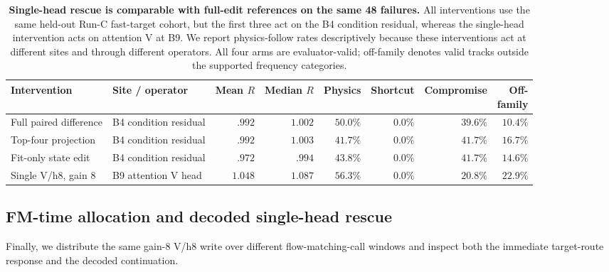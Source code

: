 \begin{table}[!htbp]
  \centering
  \caption{\textbf{Single-head rescue is comparable with full-edit references
  on the same 48 failures.} All interventions use the same held-out Run-C
  fast-target cohort, but the first three act on the B4 condition residual,
  whereas the single-head intervention acts on attention V at B9. We report
  physics-follow rates descriptively because these interventions act at
  different sites and through different operators. All four arms are
  evaluator-valid; off-family denotes valid tracks outside the supported
  frequency categories.}
  \label{tab:single-head-oracle-ceiling}
  \setlength{\tabcolsep}{1.8pt}
  \begin{tabular}{@{}llrrrrrr@{}}
    \toprule
    Intervention & Site / operator & \shortstack{Mean\\$R$} & \shortstack{Median\\$R$} & Physics & Shortcut & Compromise & \shortstack{Off-\\family} \\
    \midrule
    Full paired difference & B4 condition residual & $.992$ & $1.002$ & $50.0\%$ & $0.0\%$ & $39.6\%$ & $10.4\%$ \\
    Top-four projection & B4 condition residual & $.992$ & $1.003$ & $41.7\%$ & $0.0\%$ & $41.7\%$ & $16.7\%$ \\
    Fit-only state edit & B4 condition residual & $.972$ & $.994$ & $43.8\%$ & $0.0\%$ & $41.7\%$ & $14.6\%$ \\
    Single V/h8, gain 8 & B9 attention V head & $1.048$ & $1.087$ & $56.3\%$ & $0.0\%$ & $20.8\%$ & $22.9\%$ \\
    \bottomrule
  \end{tabular}
\end{table}

\FloatBarrier

\subsection{FM-time allocation and decoded single-head rescue}
\label{app:fm-time-rescue}

Finally, we distribute the same gain-8 V/h8 write over different
flow-matching-call windows and inspect both the immediate target-route response
and the decoded continuation.

